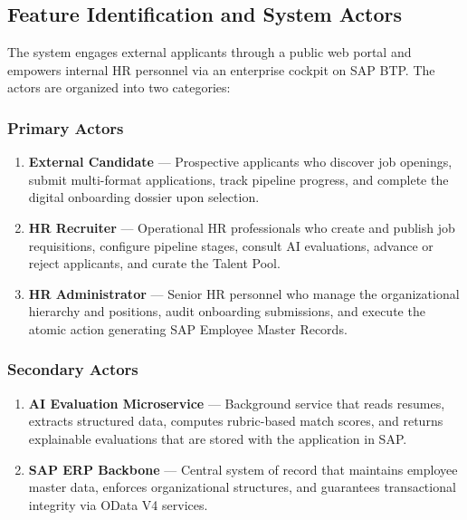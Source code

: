\subsection{Feature Identification and System Actors}
\label{subsec:feature_identification}

The system engages external applicants through a public web portal and empowers internal HR personnel via an enterprise cockpit on SAP BTP. The actors are organized into two categories:

\subsubsection{Primary Actors}

\begin{enumerate}
    \item \textbf{External Candidate} --- Prospective applicants who discover job openings, submit multi-format applications, track pipeline progress, and complete the digital onboarding dossier upon selection.

    \item \textbf{HR Recruiter} --- Operational HR professionals who create and publish job requisitions, configure pipeline stages, consult AI evaluations, advance or reject applicants, and curate the Talent Pool.

    \item \textbf{HR Administrator} --- Senior HR personnel who manage the organizational hierarchy and positions, audit onboarding submissions, and execute the atomic action generating SAP Employee Master Records.
\end{enumerate}

\subsubsection{Secondary Actors}

\begin{enumerate}
    \item \textbf{AI Evaluation Microservice} --- Background service that reads resumes, extracts structured data, computes rubric-based match scores, and returns explainable evaluations that are stored with the application in SAP.

    \item \textbf{SAP ERP Backbone} --- Central system of record that maintains employee master data, enforces organizational structures, and guarantees transactional integrity via OData V4 services.
\end{enumerate}

